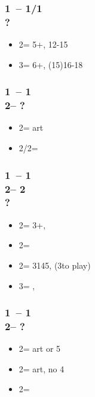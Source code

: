 \documentclass[12pt, a4paper]{article}
\begin{document}
\subsubsection*{1\clubs\ -- 1\hearts/1\spades \\ ?}
\begin{itemize}
    \item 2\clubs = 5+\clubs, 12-15 \unbal
    \item 3\clubs = 6+\clubs, (15)16-18 \unbal
\end{itemize}

\subsubsection*{1\clubs\ -- 1\hearts \\ 
                2\clubs -- ?}
\begin{itemize}
    \item 2\diams = \inv art \vimp
    \item 2\spades/2\nt = \gf
\end{itemize}

\subsubsection*{1\clubs\ -- 1\hearts \\ 
                2\clubs -- 2\diams\\
                ?}
\begin{itemize}
    \item 2\hearts = 3+\hearts, \fonce
    \item 2\spades = \gf
    \item 2\nt = 3145, \nf (3\diams to play)
    \item 3\clubs = \nat, \nf
\end{itemize}

\subsubsection*{1\clubs\ -- 1\spades \\ 
                2\clubs -- ?}
\begin{itemize}
    \item 2\diams = \inv art or 5\hearts \gf \vimp
    \item 2\hearts = \gf art, no 4\hearts \vimp
    \item 2\nt = \gf
\end{itemize}
\end{document}
